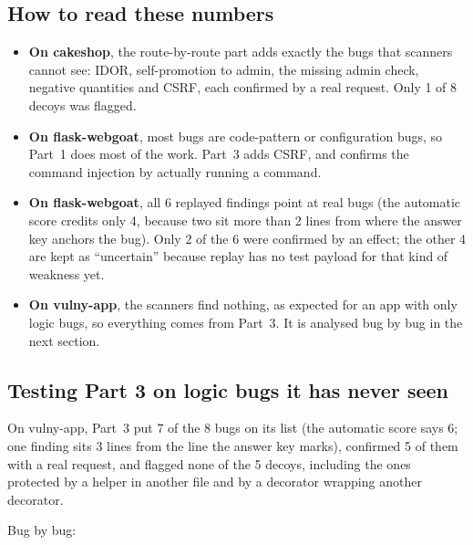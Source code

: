 \documentclass[11pt,a4paper]{article}
\begin{document}
\subsection{How to read these numbers}
\begin{itemize}
  \item \textbf{On cakeshop}, the route-by-route part adds exactly the bugs that scanners cannot see: IDOR,
        self-promotion to admin, the missing admin check, negative quantities and CSRF, each confirmed by a real
        request. Only 1 of 8 decoys was flagged.
  \item \textbf{On flask-webgoat}, most bugs are code-pattern or configuration bugs, so Part~1 does most of the
        work. Part~3 adds CSRF, and confirms the command injection by actually running a command.
  \item \textbf{On flask-webgoat}, all 6 replayed findings point at real bugs (the automatic score credits only 4,
        because two sit more than 2 lines from where the answer key anchors the bug). Only 2 of the 6 were
        confirmed by an effect; the other 4 are kept as
        ``uncertain'' because replay has no test payload for that kind of weakness yet.
  \item \textbf{On vulny-app}, the scanners find nothing, as expected for an app with only logic bugs, so everything
        comes from Part~3. It is analysed bug by bug in the next section.
\end{itemize}

\subsection{Testing Part 3 on logic bugs it has never seen}
\label{sec:vulny}

On vulny-app, Part~3 put 7 of the 8 bugs on its list (the automatic score says 6; one finding sits 3 lines from
the line the answer key marks), confirmed 5 of them with a real request, and flagged none of the 5 decoys,
including the ones protected by a helper in another file and by a decorator wrapping another decorator.


Bug by bug:
\end{document}
